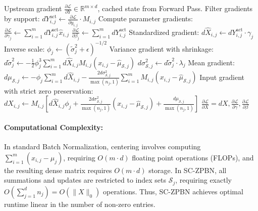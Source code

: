\documentclass[twocolumn,10pt]{article}
\begin{document}
\begin{algorithm}[t]
\caption{SC-ZPBN Exact Backward Pass}
\label{alg:backward}
\begin{algorithmic}[1]
\Require Upstream gradient $\frac{\partial \mathcal{L}}{\partial Y} \in \mathbb{R}^{m \times d}$, cached state from Forward Pass.
\State Filter gradients by support: $dY^{\mathrm{act}}_{i,j} \gets \frac{\partial \mathcal{L}}{\partial y_{i,j}} \cdot M_{i,j}$
\State Compute parameter gradients:
\State \quad $\frac{\partial \mathcal{L}}{\partial \gamma_j} \gets \sum_{i=1}^m dY^{\mathrm{act}}_{i,j} \hat{x}_{i,j}$
\State \quad $\frac{\partial \mathcal{L}}{\partial \beta_j} \gets \sum_{i=1}^m dY^{\mathrm{act}}_{i,j}$
\State Standardized gradient: $d\hat{X}_{i,j} \gets dY^{\mathrm{act}}_{i,j} \cdot \gamma_j$
\State Inverse scale: $\phi_j \gets (\tilde{\sigma}_j^2 + \epsilon)^{-1/2}$
\State Variance gradient with shrinkage:
\State \quad $d\tilde{\sigma}_j^2 \gets -\frac{1}{2}\phi_j^3 \sum_{i=1}^m d\hat{X}_{i,j} M_{i,j}(x_{i,j} - \hat{\mu}_{\mathcal{S}, j})$
\State \quad $d\sigma^2_{\mathcal{S}, j} \gets d\tilde{\sigma}_j^2 \cdot \lambda_j$
\State Mean gradient:
\State \quad $d\mu_{\mathcal{S}, j} \gets -\phi_j \sum_{i=1}^m d\hat{X}_{i,j} - \frac{2 d\sigma^2_{\mathcal{S}, j}}{\max(n_j, 1)}\sum_{i=1}^m M_{i,j}(x_{i,j} - \hat{\mu}_{\mathcal{S}, j})$
\State Input gradient with strict zero preservation:
\State $dX_{i,j} \gets M_{i,j} \left[ d\hat{X}_{i,j}\phi_j + \frac{2 d\sigma^2_{\mathcal{S}, j}}{\max(n_j, 1)}(x_{i,j} - \hat{\mu}_{\mathcal{S}, j}) + \frac{d\mu_{\mathcal{S}, j}}{\max(n_j, 1)} \right]$
\State \Return $\frac{\partial \mathcal{L}}{\partial X} = dX, \frac{\partial \mathcal{L}}{\partial \gamma}, \frac{\partial \mathcal{L}}{\partial \beta}$
\end{algorithmic}
\end{algorithm}

\paragraph{Computational Complexity:}
In standard Batch Normalization, centering involves computing $\sum_{i=1}^m (x_{i,j} - \mu_j)$, requiring $O(m \cdot d)$ floating point operations (FLOPs), and the resulting dense matrix requires $O(m \cdot d)$ storage. In SC-ZPBN, all summations and updates are restricted to index sets $\mathcal{S}_j$, requiring exactly $O(\sum_{j=1}^d n_j) = O(\|X\|_0)$ operations. Thus, SC-ZPBN achieves optimal runtime linear in the number of non-zero entries.

\end{document}
